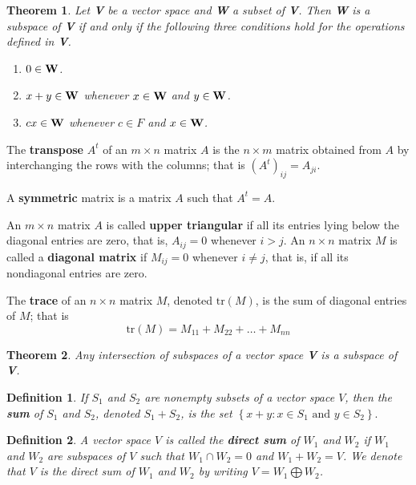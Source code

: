 \documentclass{article}
\newtheorem{theorem}{Theorem}
\newtheorem*{definition}{Definition}
\begin{document}
\begin{theorem}
	Let \textbf{\textup{V}} be a vector space and \textbf{\textup{W}} a subset of \textbf{\textup{V}}. Then \textbf{\textup{W}} is a subspace of \textbf{\textup{V}} if and only if the following three conditions hold for the operations defined in \textbf{\textup{V}}.
	\begin{enumerate}
		\item $0 \in \textbf{\textup{W}}$.
		\item $x + y \in \textbf{\textup{W}}$ whenever $x \in \textbf{\textup{W}}$ and $y \in \textbf{\textup{W}}$.
		\item $cx \in \textbf{\textup{W}}$ whenever $c \in F$ and $x \in \textbf{\textup{W}}$.
	\end{enumerate}
\end{theorem}

The \textbf{transpose} $A^t$ of an $m \times n$ matrix $A$ is the $n \times m$ matrix obtained from $A$ by interchanging the rows with the columns; that is $(A^t)_{ij} = A_{ji}$.

A \textbf{symmetric} matrix is a matrix $A$ such that $A^t = A$.

An $m \times n$ matrix $A$ is called \textbf{upper triangular} if all its entries lying below the diagonal entries are zero, that is, $A_{ij} = 0$ whenever $i > j$. An $n \times n$ matrix $M$ is called a \textbf{diagonal matrix} if $M_{ij} = 0$ whenever $i \ne j$, that is, if all its nondiagonal entries are zero.

The \textbf{trace} of an $n \times n$ matrix $M$, denoted $\text{tr}(M)$, is the sum of diagonal entries of $M$; that is \[ \text{tr}(M) = M_{11} + M_{22} + \dots + M_{nn} \]

\begin{theorem}
	Any intersection of subspaces of a vector space \textbf{\textup{V}} is a subspace of \textbf{V}.
\end{theorem}

\begin{definition}
	If $S_1$ and $S_2$ are nonempty subsets of a vector space $V$, then the \textbf{sum} of $S_1$ and $S_2$, denoted $S_1 + S_2$, is the set $\left\{x + y: x\in S_1 \text{ and } y \in S_2\right\}.$
\end{definition}

\begin{definition}
	A vector space $V$ is called the \textbf{direct sum} of $W_1$ and $W_2$ if $W_1$ and $W_2$ are subspaces of $V$ such that $W_1 \cap W_2 = {0}$ and $W_1 + W_2 = V$. We denote that $V$ is the direct sum of $W_1$ and $W_2$ by writing $V = W_1 \bigoplus W_2$.
\end{definition}
\end{document}
